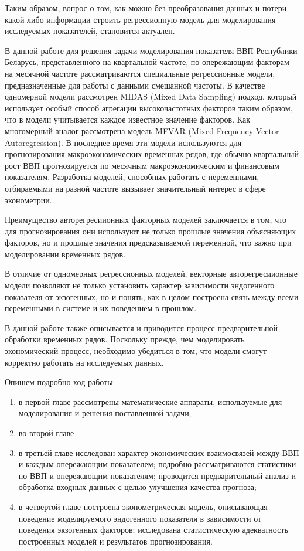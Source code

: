 \documentclass[a4paper, 14pt]{extreport}
\numberwithin{equation}{section}
\numberwithin{equation}{section}
\begin{document}
	Таким образом, вопрос о том, как можно без преобразования данных и потери какой-либо информации строить регрессионную модель для моделирования исследуемых показателей, становится актуален.
	
	В данной работе для решения задачи моделирования показателя ВВП Республики Беларусь, представленного на квартальной частоте, по опережающим факторам на месячной частоте рассматриваются специальные регрессионные модели, предназначенные для работы с данными смешанной частоты. 
	В качестве одномерной модели рассмотрен MIDAS (Mixed Data Sampling) подход, который использует особый способ агрегации высокочастотных факторов таким образом, что в модели учитывается каждое известное значение факторов. Как многомерный аналог рассмотрена модель MFVAR (Mixed Frequency Vector Autoregression). В последнее время эти модели используются для прогнозирования макроэкономических временных рядов, где обычно квартальный
	рост ВВП прогнозируется по месячным макроэкономическим и финансовым показателям. Разработка моделей, способных работать с переменными, отбираемыми на разной частоте вызывает значительный интерес в сфере эконометрии.
	
	Преимущество авторегресиионных факторных моделей заключается в том, что для прогнозирования они используют не только прошлые значения объясняющих факторов, но и прошлые значения предсказываемой переменной, что важно при моделировании временных рядов. 
	
	В отличие от одномерных регрессионных моделей, векторные авторегресиионные модели позволяют не только установить характер зависимости эндогенного показателя от экзогенных, но и понять, как в целом построена связь между всеми переменными в системе и их поведением в прошлом.
	
	В данной работе также описывается и приводится процесс предварительной обработки временных рядов. Поскольку прежде, чем моделировать экономический процесс, необходимо убедиться в том, что модели смогут корректно работать на исследуемых данных.
	
	Опишем подробно ход работы:
	\begin{enumerate}
		\item в первой главе рассмотрены математические аппараты, используемые для моделирования и решения поставленной задачи;
		\item во второй главе 
		\item в третьей главе исследован характер экономических взаимосвязей между ВВП и каждым опережающим показателем; подробно рассматриваются статистики по ВВП и опережающим показателям; проводится предварительный анализ и обработка входных данных с целью улучшения качества прогноза;
		\item в четвертой главе построена эконометрическая модель, описывающая поведение моделируемого эндогенного показателя в зависимости от поведения экзогенных факторов; исследована статистическую адекватность построенных моделей и результатов прогнозирования.
	\end{enumerate}
	\newpage
\end{document}

